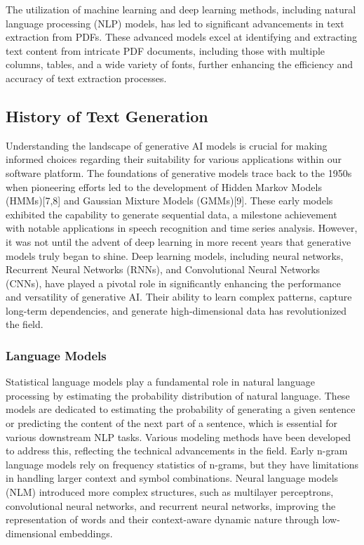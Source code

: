 \documentclass[conference]{IEEEtran}
\begin{document}
The utilization of machine learning and deep learning methods, including natural language processing (NLP) models, has led to significant advancements in text extraction from PDFs. These advanced models excel at identifying and extracting text content from intricate PDF documents, including those with multiple columns, tables, and a wide variety of fonts, further enhancing the efficiency and accuracy of text extraction processes.

\subsection{History of Text Generation}

Understanding the landscape of generative AI models is crucial for making informed choices regarding their suitability for various applications within our software platform. The foundations of generative models trace back to the 1950s when pioneering efforts led to the development of Hidden Markov Models (HMMs)[7,8] and Gaussian Mixture Models (GMMs)[9]. These early models exhibited the capability to generate sequential data, a milestone achievement with notable applications in speech recognition and time series analysis. However, it was not until the advent of deep learning in more recent years that generative models truly began to shine. Deep learning models, including neural networks, Recurrent Neural Networks (RNNs), and Convolutional Neural Networks (CNNs), have played a pivotal role in significantly enhancing the performance and versatility of generative AI. Their ability to learn complex patterns, capture long-term dependencies, and generate high-dimensional data has revolutionized the field.

\subsubsection{Language Models}

Statistical language models play a fundamental role in natural language processing by estimating the probability distribution of natural language. These models are dedicated to estimating the probability of generating a given sentence or predicting the content of the next part of a sentence, which is essential for various downstream NLP tasks. Various modeling methods have been developed to address this, reflecting the technical advancements in the field. Early n-gram language models rely on frequency statistics of n-grams, but they have limitations in handling larger context and symbol combinations. Neural language models (NLM) introduced more complex structures, such as multilayer perceptrons, convolutional neural networks, and recurrent neural networks, improving the representation of words and their context-aware dynamic nature through low-dimensional embeddings.
\end{document}
